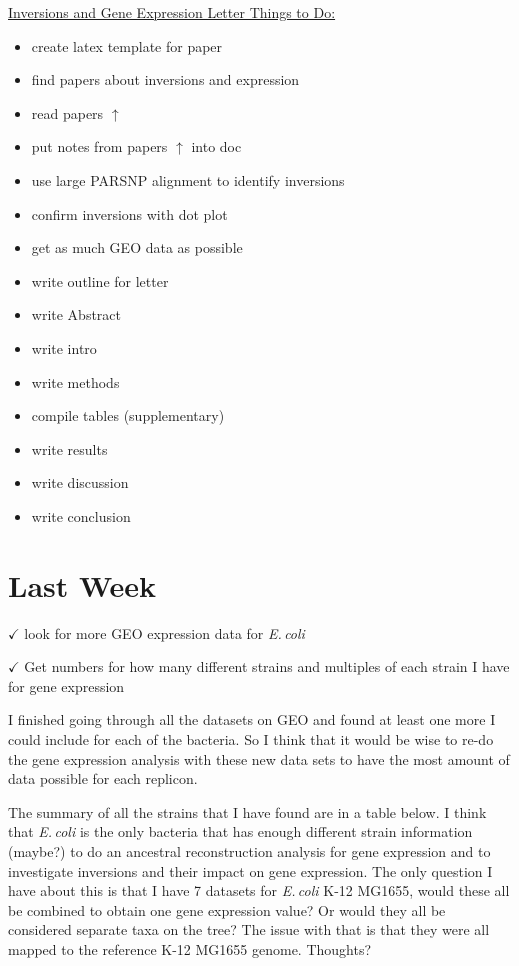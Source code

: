 \documentclass[12pt]{article}
\newcommand{\ecol}{\textit{E.\,coli}\xspace}
\begin{document}
\underline{Inversions and Gene Expression Letter Things to Do:}
\begin{itemize}
	\item create latex template for paper
	\item find papers about inversions and expression
	\item read papers $\uparrow$
	\item put notes from papers $\uparrow$ into doc
	\item use large PARSNP alignment to identify inversions
	\item confirm inversions with dot plot
	\item get as much GEO data as possible
	\item write outline for letter
	\item write Abstract
	\item write intro
	\item write methods
	\item compile tables (supplementary)
	\item write results
	\item write discussion
	\item write conclusion 
\end{itemize}




	
\section*{Last Week}

$\checkmark$ look for more GEO expression data for \ecol

$\checkmark$ Get numbers for how many different strains and multiples of each strain I have for gene expression

I finished going through all the datasets on GEO and found at least one more I could include for each of the bacteria. So I think that it would be wise to re-do the gene expression analysis with these new data sets to have the most amount of data possible for each replicon.

The summary of all the strains that I have found are in a table below.
I think that \ecol is the only bacteria that has enough different strain information (maybe?) to do an ancestral reconstruction analysis for gene expression and to investigate inversions and their impact on gene expression.
The only question I have about this is that I have 7 datasets for \ecol K-12 MG1655, would these all be combined to obtain one gene expression value? Or would they all be considered separate taxa on the tree? The issue with that is that they were all mapped to the reference K-12 MG1655 genome. Thoughts?
\end{document}
